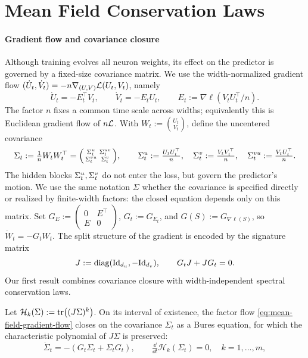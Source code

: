 \section{Mean Field Conservation Laws}
\label{sec:laws}\label{sec:conservation-hyperbolic}

\paragraph{Gradient flow and covariance closure}
Although training evolves all neuron weights, its effect on the
predictor is governed by a fixed-size covariance matrix.
We use the width-normalized gradient flow
$(\dot U_t,\dot V_t)=-n\nabla_{(U,V)}\mathcal L(U_t,V_t)$, namely
\begin{equation}\label{eq:mean-field-gradient-flow}
 \dot U_t=-E_t^\top V_t,\qquad
 \dot V_t=-E_tU_t,\qquad E_t:=\nabla\ell(V_tU_t^\top/n).
\end{equation}
The factor $n$ fixes a common time scale across widths; equivalently
this is Euclidean gradient flow of $n\mathcal L$.
With $W_t:=\binom{U_t}{V_t}$, define the uncentered covariance
\[
 \Sigma_t:=\tfrac1nW_tW_t^\top
 =\begin{psmallmatrix}\Sigma^u_t&\Sigma^{uv}_t\\\Sigma^{vu}_t&\Sigma^v_t\end{psmallmatrix},
 \qquad
 \Sigma^u_t:=\tfrac{U_tU_t^\top}{n},\quad
 \Sigma^v_t:=\tfrac{V_tV_t^\top}{n},\quad
 \Sigma^{vu}_t:=\tfrac{V_tU_t^\top}{n}.
\]
The hidden blocks $\Sigma^u_t,\Sigma^v_t$ do not enter the loss, but govern
the predictor's motion. We use the same notation $\Sigma$ whether the
covariance is specified directly or realized by finite-width factors:
the closed equation depends only on this matrix.
Set
$G_E:=\left(\begin{smallmatrix}0&E^\top\\E&0\end{smallmatrix}\right)$,
$G_t:=G_{E_t}$, and $G(S):=G_{\nabla\ell(S)}$, so $\dot W_t=-G_tW_t$.
The split structure of the gradient is encoded by the signature matrix
\[
 J:=\operatorname{diag}(\mathrm{Id}_{d_u},-\mathrm{Id}_{d_v}),\qquad G_tJ+JG_t=0.
\]
Our first result combines covariance closure with width-independent spectral conservation laws.
\begin{proposition}
\label{prop:covariance-closure-laws}
Let $\mathcal H_k(\Sigma):=\operatorname{tr}\!\left((J\Sigma)^k\right)$.
On its interval of existence, the factor flow
\eqref{eq:mean-field-gradient-flow} closes on the covariance $\Sigma_t$ as a Bures equation, for which the characteristic polynomial of $J\Sigma$ is preserved:
\begin{equation}\label{eq:bures-G}
 \dot\Sigma_t=-(G_t\Sigma_t+\Sigma_tG_t), \qquad
 \tfrac{\dd}{\dd t}\mathcal H_k(\Sigma_t)=0, \quad k=1,\ldots,m,
\end{equation}
\end{proposition}

